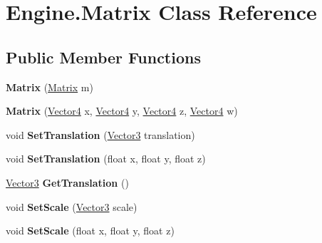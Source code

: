 \hypertarget{class_engine_1_1_matrix}{\section{Engine.\-Matrix Class Reference}
\label{class_engine_1_1_matrix}
}
\subsection*{Public Member Functions}
\begin{DoxyCompactItemize}
\item 
\hypertarget{class_engine_1_1_matrix_aadbfad414618d6f64d8f49c0673dfc6c}{{\bfseries Matrix} (\hyperlink{class_engine_1_1_matrix}{Matrix} m)}\label{class_engine_1_1_matrix_aadbfad414618d6f64d8f49c0673dfc6c}

\item 
\hypertarget{class_engine_1_1_matrix_a43b4b8e7b96934c0cf05d4e79547de40}{{\bfseries Matrix} (\hyperlink{struct_engine_1_1_vector4}{Vector4} x, \hyperlink{struct_engine_1_1_vector4}{Vector4} y, \hyperlink{struct_engine_1_1_vector4}{Vector4} z, \hyperlink{struct_engine_1_1_vector4}{Vector4} w)}\label{class_engine_1_1_matrix_a43b4b8e7b96934c0cf05d4e79547de40}

\item 
\hypertarget{class_engine_1_1_matrix_a36204a94f0b9a06262534bf1d345f6a1}{void {\bfseries Set\-Translation} (\hyperlink{struct_engine_1_1_vector3}{Vector3} translation)}\label{class_engine_1_1_matrix_a36204a94f0b9a06262534bf1d345f6a1}

\item 
\hypertarget{class_engine_1_1_matrix_ad482613a220a80addaab68aafc0b12ef}{void {\bfseries Set\-Translation} (float x, float y, float z)}\label{class_engine_1_1_matrix_ad482613a220a80addaab68aafc0b12ef}

\item 
\hypertarget{class_engine_1_1_matrix_abba83aba18a610f9ad7b089a3f172f94}{\hyperlink{struct_engine_1_1_vector3}{Vector3} {\bfseries Get\-Translation} ()}\label{class_engine_1_1_matrix_abba83aba18a610f9ad7b089a3f172f94}

\item 
\hypertarget{class_engine_1_1_matrix_a1fcd05c6221af46efb28f3a78f214443}{void {\bfseries Set\-Scale} (\hyperlink{struct_engine_1_1_vector3}{Vector3} scale)}\label{class_engine_1_1_matrix_a1fcd05c6221af46efb28f3a78f214443}

\item 
\hypertarget{class_engine_1_1_matrix_a993442aac2c3fd77c8860d482ca8fd12}{void {\bfseries Set\-Scale} (float x, float y, float z)}\label{class_engine_1_1_matrix_a993442aac2c3fd77c8860d482ca8fd12}


\end{DoxyCompactItemize}
